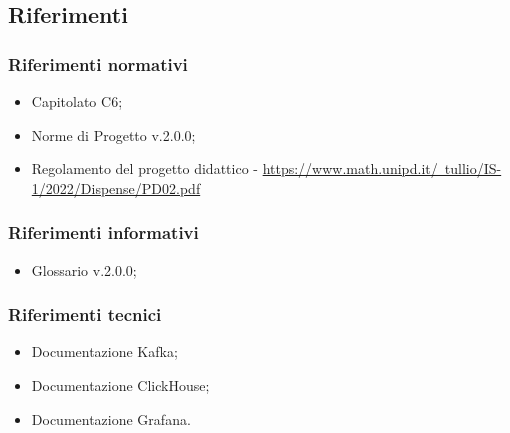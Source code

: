 \subsection{Riferimenti}
\subsubsection{Riferimenti normativi}
\begin{itemize}
    \item Capitolato C6;
    \item Norme di Progetto v.2.0.0;
    \item  Regolamento del progetto didattico - \href{https://www.math.unipd.it/~tullio/IS-1/2022/Dispense/PD02.pdf}{https://www.math.unipd.it/~tullio/IS-1/2022/Dispense/PD02.pdf}
\end{itemize}
\subsubsection{Riferimenti informativi}
\begin{itemize}
    \item Glossario v.2.0.0;
\end{itemize}
\subsubsection{Riferimenti tecnici}
\begin{itemize}
    \item Documentazione Kafka;
    \item Documentazione ClickHouse;
    \item Documentazione Grafana.
\end{itemize} 
